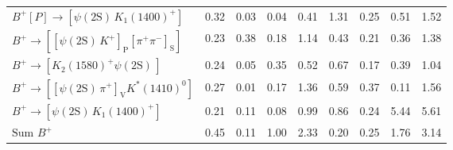 \begin{tabular}{l  c  c  c  c  c  c  c  | c }
$B^{+}\left[P\right]\rightarrow \left[\psi(\text{2S})\,K_{1}(1400)^{+}\right]$ & 0.32 & 0.03 & 0.04 & 0.41 & 1.31 & 0.25 & 0.51 & 1.52 \\ 
$B^{+}\rightarrow \left[\left[\psi(\text{2S})\,K^{+}\right]_{\text{P}}\left[\pi^{+}\pi^{-}\right]_{\text{S}}\right]$ & 0.23 & 0.38 & 0.18 & 1.14 & 0.43 & 0.21 & 0.36 & 1.38 \\ 
$B^{+}\rightarrow \left[K_{2}(1580)^{+}\psi(\text{2S})\,\right]$ & 0.24 & 0.05 & 0.35 & 0.52 & 0.67 & 0.17 & 0.39 & 1.04 \\ 
$B^{+}\rightarrow \left[\left[\psi(\text{2S})\,\pi^{+}\right]_{\text{V}}K^{*}(1410)^{0}\right]$ & 0.27 & 0.01 & 0.17 & 1.36 & 0.59 & 0.37 & 0.11 & 1.56 \\ 
$B^{+}\rightarrow \left[\psi(\text{2S})\,K_{1}(1400)^{+}\right]$ & 0.21 & 0.11 & 0.08 & 0.99 & 0.86 & 0.24 & 5.44 & 5.61 \\ 
$\text{Sum } B^{+}$ & 0.45 & 0.11 & 1.00 & 2.33 & 0.20 & 0.25 & 1.76 & 3.14 \\ 
\hline
\hline
\end{tabular}
